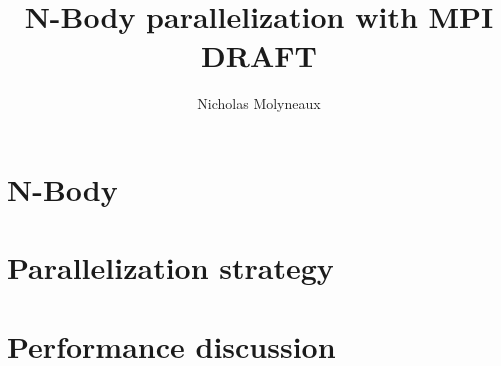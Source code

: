 \documentclass[a4paper,11pt]{article}
\begin{document}
\setlength{\parindent}{0pt}
\setlength{\parskip}{5pt plus 1pt minus 1pt}

\title{N-Body parallelization with MPI\\ DRAFT}
\author{Nicholas Molyneaux}
\vspace{-4cm}
\maketitle



\section{N-Body}

\section{Parallelization strategy}

\section{Performance discussion}


\nocite{*}

\end{document}
